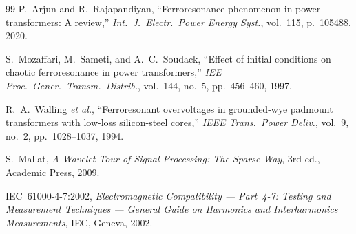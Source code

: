 \documentclass[11pt, a4paper]{article}
\begin{document}
\begin{thebibliography}{99}
P.~Arjun and R.~Rajapandiyan,
``Ferroresonance phenomenon in power transformers: A review,''
\emph{Int.\ J.\ Electr.\ Power Energy Syst.}, vol.~115, p.~105488, 2020.

S.~Mozaffari, M.~Sameti, and A.~C.~Soudack,
``Effect of initial conditions on chaotic ferroresonance in power transformers,''
\emph{IEE Proc.\ Gener.\ Transm.\ Distrib.}, vol.~144, no.~5, pp.~456--460, 1997.

R.~A.~Walling \emph{et al.},
``Ferroresonant overvoltages in grounded-wye padmount transformers with
low-loss silicon-steel cores,''
\emph{IEEE Trans.\ Power Deliv.}, vol.~9, no.~2, pp.~1028--1037, 1994.

S.~Mallat,
\emph{A Wavelet Tour of Signal Processing: The Sparse Way},
3rd ed., Academic Press, 2009.

IEC~61000-4-7:2002, \emph{Electromagnetic Compatibility --- Part~4-7:
Testing and Measurement Techniques --- General Guide on Harmonics and
Interharmonics Measurements}, IEC, Geneva, 2002.
\end{thebibliography}
\end{document}
